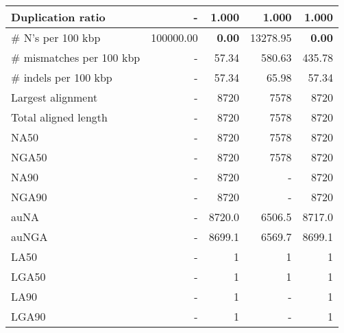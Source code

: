 \documentclass[12pt,a4paper]{article}
\begin{document}
\begin{table}[ht]
\begin{center}
\begin{tabular}{|l*{4}{|r}|}
Duplication ratio & - & 1.000 & 1.000 & 1.000 \\ \hline
\# N's per 100 kbp & 100000.00 & {\bf 0.00} & 13278.95 & {\bf 0.00} \\ \hline
\# mismatches per 100 kbp & - & 57.34 & 580.63 & 435.78 \\ \hline
\# indels per 100 kbp & - & 57.34 & 65.98 & 57.34 \\ \hline
Largest alignment & - & 8720 & 7578 & 8720 \\ \hline
Total aligned length & - & 8720 & 7578 & 8720 \\ \hline
NA50 & - & 8720 & 7578 & 8720 \\ \hline
NGA50 & - & 8720 & 7578 & 8720 \\ \hline
NA90 & - & 8720 & - & 8720 \\ \hline
NGA90 & - & 8720 & - & 8720 \\ \hline
auNA & - & 8720.0 & 6506.5 & 8717.0 \\ \hline
auNGA & - & 8699.1 & 6569.7 & 8699.1 \\ \hline
LA50 & - & 1 & 1 & 1 \\ \hline
LGA50 & - & 1 & 1 & 1 \\ \hline
LA90 & - & 1 & - & 1 \\ \hline
LGA90 & - & 1 & - & 1 \\ \hline
\end{tabular}
\end{center}
\end{table}
\end{document}
